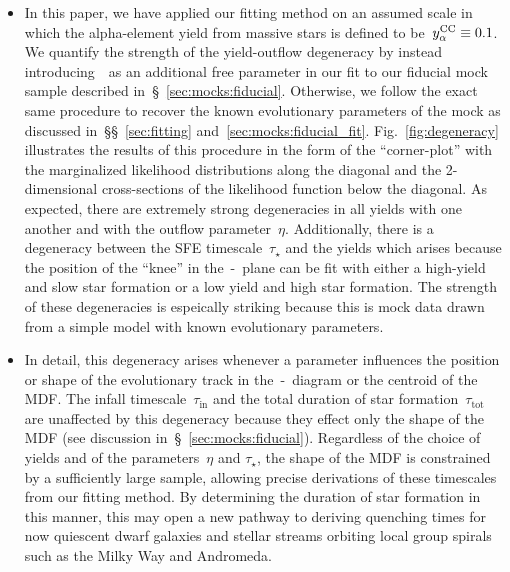 \documentclass[ms.tex]{subfiles}
\begin{document}
\begin{itemize}
	\item In this paper, we have applied our fitting method on an assumed scale
	in which the alpha-element yield from massive stars is defined to
	be~$y_\alpha^\text{CC} \equiv 0.1$.
	We quantify the strength of the yield-outflow degeneracy by instead
	introducing~\yacc~as an additional free parameter in our fit to our
	fiducial mock sample described in~\S~\ref{sec:mocks:fiducial}.
	Otherwise, we follow the exact same procedure to recover the known
	evolutionary parameters of the mock as discussed
	in~\S\S~\ref{sec:fitting} and~\ref{sec:mocks:fiducial_fit}.
	Fig.~\ref{fig:degeneracy} illustrates the results of this procedure in the
	form of the ``corner-plot'' with the marginalized likelihood distributions
	along the diagonal and the 2-dimensional cross-sections of the likelihood
	function below the diagonal.
	As expected, there are extremely strong degeneracies in all yields with
	one another and with the outflow parameter~$\eta$.
	Additionally, there is a degeneracy between the SFE timescale~$\tau_\star$
	and the yields which arises because the position of the ``knee'' in
	the~\afe-\feh~plane can be fit with either a high-yield and slow star
	formation or a low yield and high star formation.
	The strength of these degeneracies is espeically striking because this is
	mock data drawn from a simple model with known evolutionary parameters.

	\item In detail, this degeneracy arises whenever a parameter influences
	the position or shape of the evolutionary track in the~\afe-\feh~diagram
	or the centroid of the MDF.
	The infall timescale~$\tau_\text{in}$ and the total duration of star
	formation~$\tau_\text{tot}$ are unaffected by this degeneracy because they
	effect only the shape of the MDF (see discussion
	in~\S~\ref{sec:mocks:fiducial}).
	Regardless of the choice of yields and of the parameters~$\eta$ and
	$\tau_\star$, the shape of the MDF is constrained by a sufficiently large
	sample, allowing precise derivations of these timescales from our fitting
	method.
	By determining the duration of star formation in this manner, this may
	open a new pathway to deriving quenching times for now quiescent dwarf
	galaxies and stellar streams orbiting local group spirals such as the
	Milky Way and Andromeda.

\end{itemize}
\end{document}
